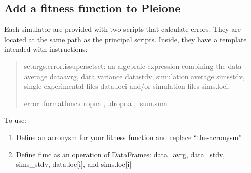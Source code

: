 \documentclass[letterpaper,10pt,english]{sphinxmanual}
\begin{document}
\subsection{Add a fitness function to Pleione}
\label{\detokenize{functions/addFitness:add-a-fitness-function-to-pleione}}\label{\detokenize{functions/addFitness::doc}}
Each simulator are provided with two scripts that calculate errors. They are
located at the same path as the principal scripts. Inside, they have a template
intended with instructions:
\begin{quote}

\begin{sphinxVerbatim}[commandchars=\\\{\}]
 setargs.error.issupersetset\PYG{o}{[}\PYG{o}{]}:
          
          an algebraic expression combining the data average data\PYGZus{}avrg, data variance data\PYGZus{}stdv, simulation average sims\PYGZus{}stdv,
        single experimental files data.loc\PYG{o}{[}i\PYG{o}{]} and/or simulation files sims.loc\PYG{o}{[}i\PYG{o}{]}.

        error\PYG{o}{[}\PYG{o}{]}  .formatfunc.dropna  ,   .dropna  ,   .sum.sum
\end{sphinxVerbatim}
\end{quote}

To use:
\begin{enumerate}
\def\theenumi{\arabic{enumi}}
\def\labelenumi{\theenumi )}
\makeatletter\def\p@enumii{\p@enumi \theenumi )}\makeatother
\item {} 
Define an acronysm for your fitness function and replace “the-acronysm”

\item {} 
Define func as an operation of DataFrames: data\_avrg, data\_stdv, sims\_stdv, data.loc{[}i{]}, and sims.loc{[}i{]}

\end{enumerate}
\end{document}
